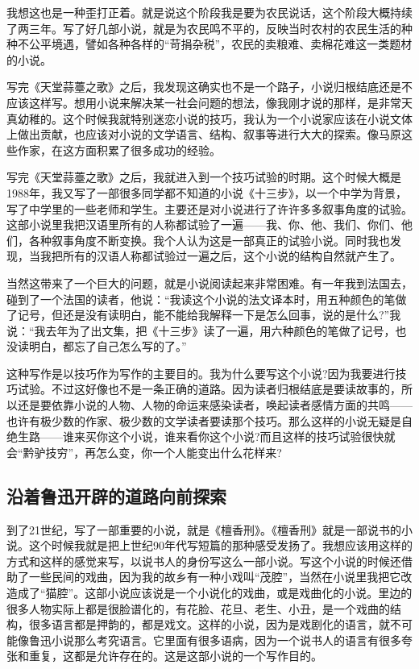 \documentclass[12pt,a5paper]{ctexbook}
\begin{document}
我想这也是一种歪打正着。就是说这个阶段我是要为农民说话，这个阶段大概持续了两三年。写了好几部小说，就是为农民鸣不平的，反映当时农村的农民生活的种种不公平境遇，譬如各种各样的“苛捐杂税”，农民的卖粮难、卖棉花难这一类题材的小说。

写完《天堂蒜薹之歌》之后，我发现这确实也不是一个路子，小说归根结底还是不应该这样写。想用小说来解决某一社会问题的想法，像我刚才说的那样，是非常天真幼稚的。这个时候我就特别迷恋小说的技巧，我认为一个小说家应该在小说文体上做出贡献，也应该对小说的文学语言、结构、叙事等进行大大的探索。像马原这些作家，在这方面积累了很多成功的经验。

写完《天堂蒜薹之歌》之后，我就进入到一个技巧试验的时期。这个时候大概是1988年，我又写了一部很多同学都不知道的小说《十三步》，以一个中学为背景，写了中学里的一些老师和学生。主要还是对小说进行了许许多多叙事角度的试验。这部小说里我把汉语里所有的人称都试验了一遍——我、你、他、我们、你们、他们，各种叙事角度不断变换。我个人认为这是一部真正的试验小说。同时我也发现，当我把所有的汉语人称都试验过一遍之后，这个小说的结构自然就产生了。

当然这带来了一个巨大的问题，就是小说阅读起来非常困难。有一年我到法国去，碰到了一个法国的读者，他说：“我读这个小说的法文译本时，用五种颜色的笔做了记号，但还是没有读明白，能不能给我解释一下是怎么回事，说的是什么?”我说：“我去年为了出文集，把《十三步》读了一遍，用六种颜色的笔做了记号，也没读明白，都忘了自己怎么写的了。”

这种写作是以技巧作为写作的主要目的。我为什么要写这个小说?因为我要进行技巧试验。不过这好像也不是一条正确的道路。因为读者归根结底是要读故事的，所以还是要依靠小说的人物、人物的命运来感染读者，唤起读者感情方面的共鸣——也许有极少数的作家、极少数的文学读者要读那个技巧。那么这样的小说无疑是自绝生路——谁来买你这个小说，谁来看你这个小说?而且这样的技巧试验很快就会“黔驴技穷”，再怎么变，你一个人能变出什么花样来?

\subsection{沿着鲁迅开辟的道路向前探索}

到了21世纪，写了一部重要的小说，就是《檀香刑》。《檀香刑》就是一部说书的小说。这个时候我就是把上世纪90年代写短篇的那种感受发扬了。我想应该用这样的方式和这样的感觉来写，以说书人的身份写这么一部小说。写这个小说的时候还借助了一些民间的戏曲，因为我的故乡有一种小戏叫“茂腔”，当然在小说里我把它改造成了“猫腔”。这部小说应该说是一个小说化的戏曲，或是戏曲化的小说。里边的很多人物实际上都是很脸谱化的，有花脸、花旦、老生、小丑，是一个戏曲的结构，很多语言都是押韵的，都是戏文。这样的小说，因为是戏剧化的语言，就不可能像鲁迅小说那么考究语言。它里面有很多语病，因为一个说书人的语言有很多夸张和重复，这都是允许存在的。这是这部小说的一个写作目的。
\end{document}
